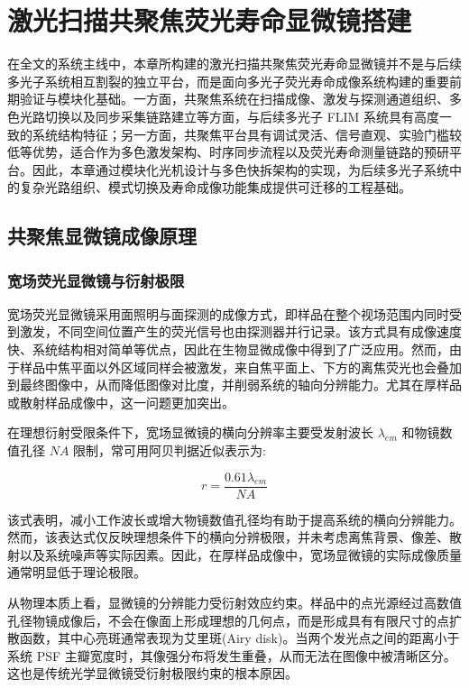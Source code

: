 \chapter{激光扫描共聚焦荧光寿命显微镜搭建}\label{Chap:3}

在全文的系统主线中，本章所构建的激光扫描共聚焦荧光寿命显微镜并不是与后续多光子系统相互割裂的独立平台，而是面向多光子荧光寿命成像系统构建的重要前期验证与模块化基础。一方面，共聚焦系统在扫描成像、激发与探测通道组织、多色光路切换以及同步采集链路建立等方面，与后续多光子 FLIM 系统具有高度一致的系统结构特征；另一方面，共聚焦平台具有调试灵活、信号直观、实验门槛较低等优势，适合作为多色激发架构、时序同步流程以及荧光寿命测量链路的预研平台。因此，本章通过模块化光机设计与多色快拆架构的实现，为后续多光子系统中的复杂光路组织、模式切换及寿命成像功能集成提供可迁移的工程基础。

\section{共聚焦显微镜成像原理}\label{3.1}
\subsection{宽场荧光显微镜与衍射极限}\label{3.1.1}
宽场荧光显微镜采用面照明与面探测的成像方式，即样品在整个视场范围内同时受到激发，不同空间位置产生的荧光信号也由探测器并行记录。该方式具有成像速度快、系统结构相对简单等优点，因此在生物显微成像中得到了广泛应用。然而，由于样品中焦平面以外区域同样会被激发，来自焦平面上、下方的离焦荧光也会叠加到最终图像中，从而降低图像对比度，并削弱系统的轴向分辨能力。尤其在厚样品或散射样品成像中，这一问题更加突出。

在理想衍射受限条件下，宽场显微镜的横向分辨率主要受发射波长 $\lambda_{em}$ 和物镜数值孔径 $NA$ 限制，常可用阿贝判据近似表示为:

\begin{equation}
    r=\frac{0.61\lambda_{em}}{NA}
\end{equation}

该式表明，减小工作波长或增大物镜数值孔径均有助于提高系统的横向分辨能力。然而，该表达式仅反映理想条件下的横向分辨极限，并未考虑离焦背景、像差、散射以及系统噪声等实际因素。因此，在厚样品成像中，宽场显微镜的实际成像质量通常明显低于理论极限。

从物理本质上看，显微镜的分辨能力受衍射效应约束。样品中的点光源经过高数值孔径物镜成像后，不会在像面上形成理想的几何点，而是形成具有有限尺寸的点扩散函数，其中心亮斑通常表现为艾里斑(Airy disk)。当两个发光点之间的距离小于系统 PSF 主瓣宽度时，其像强分布将发生重叠，从而无法在图像中被清晰区分。这也是传统光学显微镜受衍射极限约束的根本原因。




